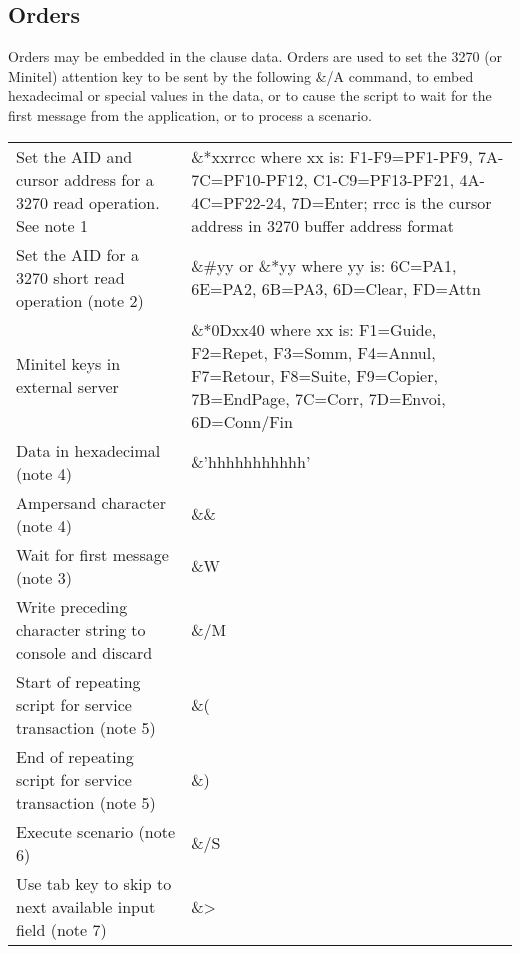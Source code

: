 \documentclass[letterpaper,10pt,english]{sphinxmanual}
\begin{document}

\subsection{Orders}
\label{\detokenize{connectivity_guide:index-120}}\label{\detokenize{connectivity_guide:orders}}
Orders may be embedded in the clause data. Orders are used to set the 3270 (or Minitel) attention key to be sent by the following \&/A command, to embed hexadecimal or special values in the data, or to cause the script to wait for the first message from the application, or to process a scenario.


\begin{savenotes}\sphinxattablestart
\centering
\begin{tabulary}{\linewidth}[t]{|T|T|}
\hline
{}\relax &\relax \\
\hline
Set the AID and cursor address for a 3270
read operation. See note 1
&
\&*xxrrcc where xx is:
F1-F9=PF1-PF9, 7A-7C=PF10-PF12, C1-C9=PF13-PF21, 4A-4C=PF22-24, 7D=Enter;
rrcc is the cursor address in 3270 buffer address format
\\
\hline
Set the AID for a 3270 short read operation (note 2)
&
\&\#yy or \&*yy where yy is:
6C=PA1, 6E=PA2, 6B=PA3,
6D=Clear, FD=Attn
\\
\hline
Minitel keys in external server
&
\&*0Dxx40 where xx is:
F1=Guide, F2=Repet, F3=Somm, F4=Annul, F7=Retour, F8=Suite, F9=Copier,
7B=EndPage, 7C=Corr, 7D=Envoi, 6D=Conn/Fin
\\
\hline
Data in hexadecimal (note 4)
&
\&’hhhhhhhhhhh’
\\
\hline
Ampersand character (note 4)
&
\&\&
\\
\hline
Wait for first message (note 3)
&
\&W
\\
\hline
Write preceding character string to console and discard
&
\&/M
\\
\hline
Start of repeating script for service transaction (note 5)
&
\&(
\\
\hline
End of repeating script for service transaction (note 5)
&
\&)
\\
\hline
Execute scenario (note 6)
&
\&/S
\\
\hline
Use tab key to skip to next available input field (note 7)
&
\&\textgreater{}
\\
\hline
\end{tabulary}
\par
\sphinxattableend\end{savenotes}
\end{document}
